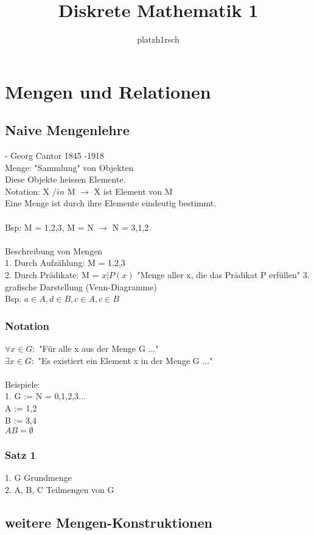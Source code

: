 \documentclass[11pt,a4paper]{article}
\author{platzh1rsch}
\title{Diskrete Mathematik 1}
\begin{document}
\section{Mengen und Relationen}
\subsection{Naive Mengenlehre}
- Georg Cantor 1845 -1918 \\
Menge: "Sammlung" von Objekten\\
Diese Objekte heissen Elemente.\\
Notation: X $ /in $ M $\rightarrow$ X ist Element von M\\
Eine Menge ist durch ihre Elemente eindeutig bestimmt.\\
\\
Bsp: M = {1,2,3}, M = N $\rightarrow$ N = {3,1,2}\\
\\
Beschreibung von Mengen\\
1. Durch Aufzählung: M = { 1,2,3 }\\
2. Durch Prädikate:  M = ${x | P(x)}$  "Menge aller x, die das Prädikat P erfüllen"
3. grafische Darstellung (Venn-Diagramme)\\
Bsp. $a \in A, d \in B, c \in A, c \in B$\\

\subsubsection{Notation}
$\forall x \in G: $   "Für alle x aus der Menge G ..."\\
$\exists x \in G: $   "Es existiert ein Element x in der Menge G ..."\\\\
Beispiele:\\
1. G := N = {0,1,2,3...}\\
   A := {1,2}\\
   B := {3,4}\\
$   A B = \emptyset$\\

\subsubsection{Satz 1}
1. G Grundmenge \\
2. A, B, C Teilmengen von G \\

\subsection{weitere Mengen-Konstruktionen}
\end{document}

